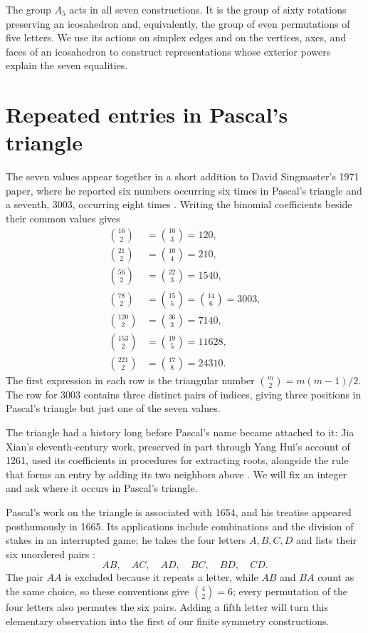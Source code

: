 \documentclass[11pt,a4paper]{article}
\begin{document}
The group $A_5$ acts in all seven constructions. It is the group of sixty rotations preserving an icosahedron and, equivalently, the group of even permutations of five letters. We use its actions on simplex edges and on the vertices, axes, and faces of an icosahedron to construct representations whose exterior powers explain the seven equalities.

\FloatBarrier
\section{Repeated entries in Pascal's triangle}\label{sec:pascal}

The seven values appear together in a short addition to David Singmaster's 1971 paper, where he reported six numbers occurring six times in Pascal's triangle and a seventh, \(3003\), occurring eight times \citep[p. 386]{Singmaster1971}. Writing the binomial coefficients beside their common values gives
\begingroup
\allowdisplaybreaks[3]
\begin{align*}
\binom{16}{2}&=\binom{10}{3}=120,\\[3pt]
\binom{21}{2}&=\binom{10}{4}=210,\\[3pt]
\binom{56}{2}&=\binom{22}{3}=1540,\\[3pt]
\binom{78}{2}&=\binom{15}{5}=\binom{14}{6}=3003,\\[3pt]
\binom{120}{2}&=\binom{36}{3}=7140,\\[3pt]
\binom{153}{2}&=\binom{19}{5}=11628,\\[3pt]
\binom{221}{2}&=\binom{17}{8}=24310.
\end{align*}
\endgroup
The first expression in each row is the triangular number \(\binom m2=m(m-1)/2\). The row for \(3003\) contains three distinct pairs of indices, giving three positions in Pascal's triangle but just one of the seven values.

The triangle had a history long before Pascal's name became attached to it: Jia Xian's eleventh-century work, preserved in part through Yang Hui's account of 1261, used its coefficients in procedures for extracting roots, alongside the rule that forms an entry by adding its two neighbors above \citep{MacTutorJiaXian}. We will fix an integer and ask where it occurs in Pascal's triangle.

Pascal's work on the triangle is associated with 1654, and his treatise appeared posthumously in 1665. Its applications include combinations and the division of stakes in an interrupted game; he takes the four letters \(A,B,C,D\) and lists their six unordered pairs \citep[pp. 469--470]{Pascal1923Triangle}:
\[
AB,\quad AC,\quad AD,\quad BC,\quad BD,\quad CD.
\]
The pair \(AA\) is excluded because it repeats a letter, while \(AB\) and \(BA\) count as the same choice, so these conventions give \(\binom42=6\); every permutation of the four letters also permutes the six pairs. Adding a fifth letter will turn this elementary observation into the first of our finite symmetry constructions.
\end{document}
